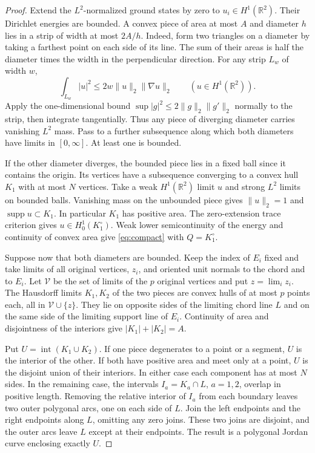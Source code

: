 \documentclass[11pt,a4paper,reqno]{amsart}
\theoremstyle{remark}
\numberwithin{equation}{section}
\newcommand{\R}{\mathbb R}
\begin{document}
\begin{proof}
Extend the $L^2$-normalized ground states by zero to $u_i\in H^1(\R^2)$.
Their Dirichlet energies are bounded. A convex piece of area at most $A$
and diameter $h$ lies in a strip of width at most $2A/h$. Indeed, form two
triangles on a diameter by taking a farthest point on each side of its line.
The sum of their areas is half the diameter times the width in the
perpendicular direction. For any strip $L_w$ of width $w$,
\[
 \int_{L_w}|u|^2\le 2w\|u\|_{2}\|\nabla u\|_{2}\qquad(u\in H^1(\R^2)).
\]
Apply the one-dimensional bound $\sup|g|^2\le2\|g\|_2\|g'\|_2$ normally
to the strip, then integrate tangentially. Thus any piece of diverging
diameter carries vanishing $L^2$ mass. Pass to a further subsequence along
which both diameters have limits in $[0,\infty]$. At least one is bounded.

If the other diameter diverges, the bounded piece lies in a fixed ball since
it contains the origin. Its vertices have a subsequence converging to a
convex hull $K_1$ with at most $N$ vertices. Take a weak $H^1(\R^2)$ limit
$u$ and strong $L^2$ limits on bounded balls. Vanishing mass on the
unbounded piece gives $\|u\|_2=1$ and $\operatorname{supp}u\subset K_1$.
In particular $K_1$ has positive area. The zero-extension trace criterion
gives $u\in H_0^1(K_1^\circ)$. Weak lower semicontinuity of the energy and
continuity of convex area give \eqref{eq:compact} with $Q=K_1^\circ$.

Suppose now that both diameters are bounded. Keep the index of $E_i$ fixed
and take limits of all original vertices, $z_i$, and oriented unit normals
to the chord and to $E_i$. Let $\mathcal V$ be the set of limits of the $p$
original vertices and put $z=\lim_i z_i$. The Hausdorff limits $K_1,K_2$
of the two pieces are convex hulls of at most $p$ points each, all in
$\mathcal V\cup\{z\}$. They lie on opposite sides of the limiting chord
line $L$ and on the same side of the limiting support line of $E_i$.
Continuity of area and disjointness of the interiors give
$|K_1|+|K_2|=A$.

Put $U=\operatorname{int}(K_1\cup K_2)$. If one piece degenerates to a
point or a segment, $U$ is the interior of the other. If both have positive
area and meet only at a point, $U$ is the disjoint union of their interiors.
In either case each component has at most $N$ sides. In the remaining case,
the intervals $I_a=K_a\cap L$, $a=1,2$, overlap in positive length.
Removing the relative interior of $I_a$ from each boundary leaves two
outer polygonal arcs, one on each side of $L$. Join the left endpoints and
the right endpoints along $L$, omitting any zero joins. These two joins are
disjoint, and the outer arcs leave $L$ except at their endpoints. The
result is a polygonal Jordan curve enclosing exactly $U$.


\end{proof}
\end{document}
